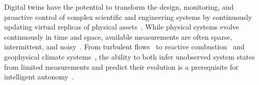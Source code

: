 \documentclass[pdflatex,sn-nature]{sn-jnl}%
\begin{document}

\maketitle
\newpage


\noindent Digital twins have the potential to transform the design, monitoring, and proactive control of complex scientific and engineering systems by continuously updating virtual replicas of physical assets~\cite{tao2024advancements}.
While physical systems evolve continuously in time and space, available measurements are often sparse, intermittent, and noisy~\cite{singh2021digital}.
From turbulent flows~\cite{vinuesa2024perspectives} to reactive combustion~\cite{wang20243} and geophysical climate systems~\cite{wang2025vast}, the ability to both infer unobserved system states from limited measurements and predict their evolution is a prerequisite for intelligent autonomy~\cite{piccialli2025digital, DENG2026140506, deng2025scientific,san2026evolution}.
\end{document}
